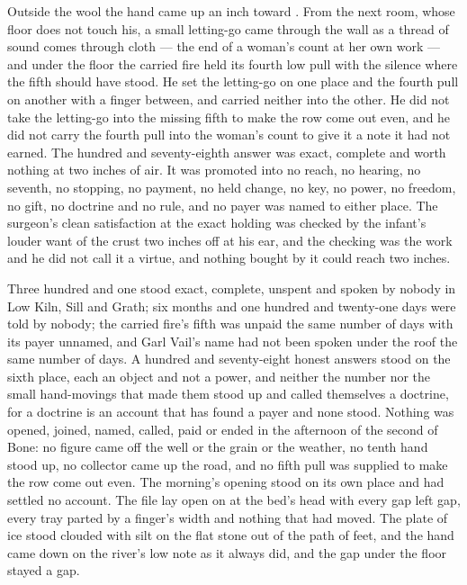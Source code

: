 Outside the wool the hand came up an inch toward . From the next room, whose floor does not touch his, a small letting-go came through the wall as a thread of sound comes through cloth --- the end of a woman's count at her own work --- and under the floor the carried fire held its fourth low pull with the silence where the fifth should have stood. He set the letting-go on one place and the fourth pull on another with a finger between, and carried neither into the other. He did not take the letting-go into the missing fifth to make the row come out even, and he did not carry the fourth pull into the woman's count to give it a note it had not earned. The hundred and seventy-eighth answer was exact, complete and worth nothing at two inches of air. It was promoted into no reach, no hearing, no seventh, no stopping, no payment, no held change, no key, no power, no freedom, no gift, no doctrine and no rule, and no payer was named to either place. The surgeon's clean satisfaction at the exact holding was checked by the infant's louder want of the crust two inches off at his ear, and the checking was the work and he did not call it a virtue, and nothing bought by it could reach two inches.

Three hundred and one stood exact, complete, unspent and spoken by nobody in Low Kiln, Sill and Grath; six months and one hundred and twenty-one days were told by nobody; the carried fire's fifth was unpaid the same number of days with its payer unnamed, and Garl Vail's name had not been spoken under the roof the same number of days. A hundred and seventy-eight honest answers stood on the sixth place, each an object and not a power, and neither the number nor the small hand-movings that made them stood up and called themselves a doctrine, for a doctrine is an account that has found a payer and none stood. Nothing was opened, joined, named, called, paid or ended in the afternoon of the second of Bone: no figure came off the well or the grain or the weather, no tenth hand stood up, no collector came up the road, and no fifth pull was supplied to make the row come out even. The morning's opening stood on its own place and had settled no account. The file lay open on  at the bed's head with every gap left gap, every tray parted by a finger's width and nothing that had moved. The plate of ice stood clouded with silt on the flat stone out of the path of feet, and the hand came down on the river's low note as it always did, and the gap under the floor stayed a gap.
